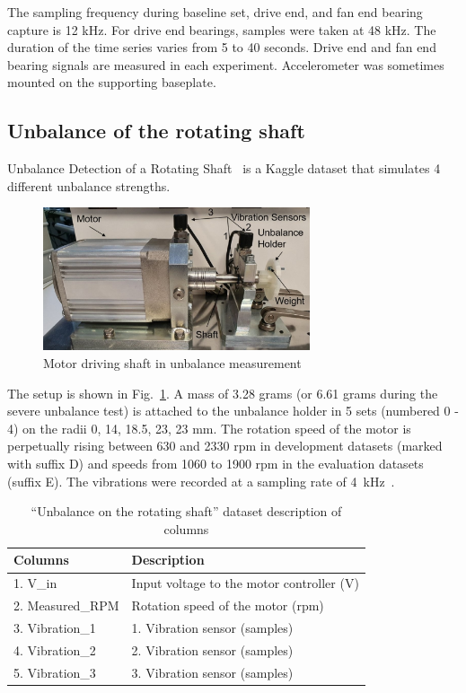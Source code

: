 The sampling frequency during baseline set, drive end, and fan end bearing capture is 12 kHz. For drive end bearings, samples were taken at 48 kHz. The duration of the time series varies from 5 to 40 seconds. Drive end and fan end bearing signals are measured in each experiment. Accelerometer was sometimes mounted on the supporting baseplate.

\subsection{Unbalance of the rotating shaft}
Unbalance Detection of a Rotating Shaft~\cite{unbalance_shaft} is a Kaggle dataset that simulates 4 different unbalance strengths.
\begin{figure}[h]
\centering
\includegraphics[width=0.7\textwidth]{assets/analysis/rotating-shaft.jpg}
\caption{Motor driving shaft in unbalance measurement \cite{mey_machine_2020}}
\label{fig:rotating-shaft}
\end{figure}

The setup is shown in Fig.~\ref{fig:rotating-shaft}. A mass of 3.28 grams (or 6.61 grams during the severe unbalance test) is attached to the unbalance holder in 5 sets (numbered 0 - 4) on the radii 0, 14, 18.5, 23, 23 mm. The rotation speed of the motor is perpetually rising between 630 and 2330 rpm in development datasets (marked with suffix D) and speeds from 1060 to 1900 rpm in the evaluation datasets (suffix E). The vibrations were recorded at a sampling rate of 4~kHz~\cite{mey_machine_2020}.

\begin{table}[h]
\centering
\renewcommand{\arraystretch}{1.2}
\begin{tabular}{|l|l|}
\hline
\textbf{Columns} & \textbf{Description}                      \\ \hline
1. V\_in         & Input voltage to the motor controller (V) \\ \hline
2. Measured\_RPM & Rotation speed of the motor (rpm)  \\ \hline
3. Vibration\_1  & 1. Vibration sensor (samples)             \\ \hline
4. Vibration\_2  & 2. Vibration sensor (samples)             \\ \hline
5. Vibration\_3  & 3. Vibration sensor (samples)             \\ \hline
\end{tabular}
\caption{``Unbalance on the rotating shaft'' dataset description of columns}
\end{table}

